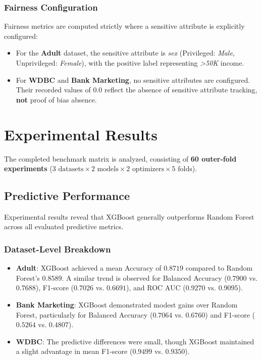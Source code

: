 \documentclass[11pt,a4paper]{article}
\begin{document}
\subsubsection{Fairness Configuration}
Fairness metrics are computed strictly where a sensitive attribute is explicitly configured:
\begin{itemize}
    \item For the \textbf{Adult} dataset, the sensitive attribute is \textit{sex} (Privileged: \textit{Male}, Unprivileged: \textit{Female}), with the positive label representing \textit{>50K} income.
    \item For \textbf{WDBC} and \textbf{Bank Marketing}, no sensitive attributes are configured. Their recorded values of $0.0$ reflect the absence of sensitive attribute tracking, \textbf{not} proof of bias absence.
\end{itemize}

\section{Experimental Results}
The completed benchmark matrix is analyzed, consisting of \textbf{60 outer-fold experiments} ($3 \text{ datasets} \times 2 \text{ models} \times 2 \text{ optimizers} \times 5 \text{ folds}$).

\subsection{Predictive Performance}
Experimental results reveal that XGBoost generally outperforms Random Forest across all evaluated predictive metrics.

\subsubsection{Dataset-Level Breakdown}
\begin{itemize}
    \item \textbf{Adult}: XGBoost achieved a mean Accuracy of $0.8719$ compared to Random Forest's $0.8589$. A similar trend is observed for Balanced Accuracy ($0.7900$ vs. $0.7688$), F1-score ($0.7026$ vs. $0.6691$), and ROC AUC ($0.9270$ vs. $0.9095$).
    \item \textbf{Bank Marketing}: XGBoost demonstrated modest gains over Random Forest, particularly for Balanced Accuracy ($0.7064$ vs. $0.6760$) and F1-score ($0.5264$ vs. $0.4807$).
    \item \textbf{WDBC}: The predictive differences were small, though XGBoost maintained a slight advantage in mean F1-score ($0.9499$ vs. $0.9350$).
\end{itemize}
\end{document}
